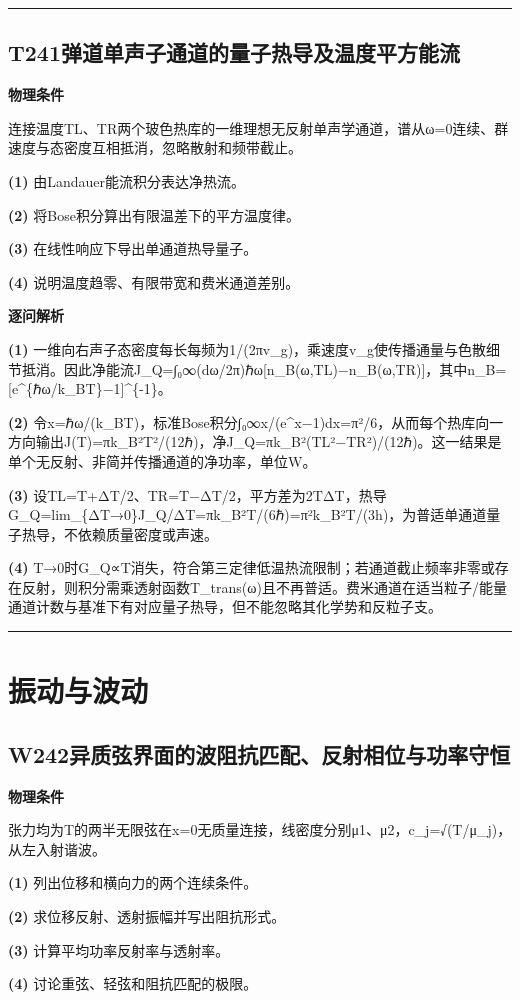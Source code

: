 \documentclass[UTF8,a4paper,11pt,oneside,openany]{ctexbook}
\begin{document}
\par\bigskip\hrule\bigskip
\section*{T241\quad 弹道单声子通道的量子热导及温度平方能流}
\textbf{物理条件}\par 连接温度TL、TR两个玻色热库的一维理想无反射单声学通道，谱从ω=0连续、群速度与态密度互相抵消，忽略散射和频带截止。
\par\noindent\textbf{(1)} 由Landauer能流积分表达净热流。
\par\noindent\textbf{(2)} 将Bose积分算出有限温差下的平方温度律。
\par\noindent\textbf{(3)} 在线性响应下导出单通道热导量子。
\par\noindent\textbf{(4)} 说明温度趋零、有限带宽和费米通道差别。

\par\medskip\noindent\textbf{逐问解析}
\par\noindent\textbf{(1)} 一维向右声子态密度每长每频为1/(2πv\_g)，乘速度v\_g使传播通量与色散细节抵消。因此净能流J\_Q=∫₀∞(dω/2π)ℏω[n\_B(ω,TL)−n\_B(ω,TR)]，其中n\_B=[e\textasciicircum{}\{ℏω/k\_BT\}−1]\textasciicircum{}\{-1\}。
\par\noindent\textbf{(2)} 令x=ℏω/(k\_BT)，标准Bose积分∫₀∞x/(e\textasciicircum{}x−1)dx=π²/6，从而每个热库向一方向输出J(T)=πk\_B²T²/(12ℏ)，净J\_Q=πk\_B²(TL²−TR²)/(12ℏ)。这一结果是单个无反射、非简并传播通道的净功率，单位W。
\par\noindent\textbf{(3)} 设TL=T+ΔT/2、TR=T−ΔT/2，平方差为2TΔT，热导G\_Q=lim\_\{ΔT→0\}J\_Q/ΔT=πk\_B²T/(6ℏ)=π²k\_B²T/(3h)，为普适单通道量子热导，不依赖质量密度或声速。
\par\noindent\textbf{(4)} T→0时G\_Q∝T消失，符合第三定律低温热流限制；若通道截止频率非零或存在反射，则积分需乘透射函数T\_trans(ω)且不再普适。费米通道在适当粒子/能量通道计数与基准下有对应量子热导，但不能忽略其化学势和反粒子支。

\par\bigskip\hrule\bigskip
\chapter{振动与波动}
\section*{W242\quad 异质弦界面的波阻抗匹配、反射相位与功率守恒}
\textbf{物理条件}\par 张力均为T的两半无限弦在x=0无质量连接，线密度分别μ1、μ2，c\_j=√(T/μ\_j)，从左入射谐波。
\par\noindent\textbf{(1)} 列出位移和横向力的两个连续条件。
\par\noindent\textbf{(2)} 求位移反射、透射振幅并写出阻抗形式。
\par\noindent\textbf{(3)} 计算平均功率反射率与透射率。
\par\noindent\textbf{(4)} 讨论重弦、轻弦和阻抗匹配的极限。
\end{document}
